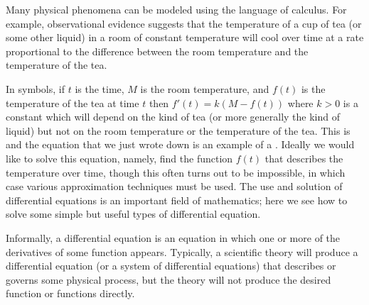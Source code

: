 Many physical phenomena can be modeled using the
language of calculus. For example, observational evidence suggests
that the temperature of a cup of tea (or some other liquid) in a
room of constant temperature will cool over time at a rate
proportional to the difference between the room temperature  and the
temperature of the tea.

In symbols, if $t$ is the time, $M$ is the room temperature,
and $f(t)$ is the temperature of the tea at time $t$ then $f'(t) =
k(M-f(t))$ where $k>0$ is a constant which will depend on the kind of tea
(or more generally the kind of liquid) but not on the room temperature
or the temperature of the tea. This is  and the equation that we
just wrote down is an example of a .  Ideally we would like to
solve this equation, namely, find the function $f(t)$ that describes
the temperature over time, though this often turns out to be
impossible, in which case various approximation techniques must be
used.  The use and solution of differential equations is an important
field of mathematics; here we see how to solve some simple but useful
types of differential equation.

Informally, a differential equation is an equation in which one or
more of the derivatives of some function appears. Typically, a
scientific theory will produce a differential equation (or a system of
differential equations) that describes or governs some physical
process, but the theory will not produce the desired function or
functions directly.
